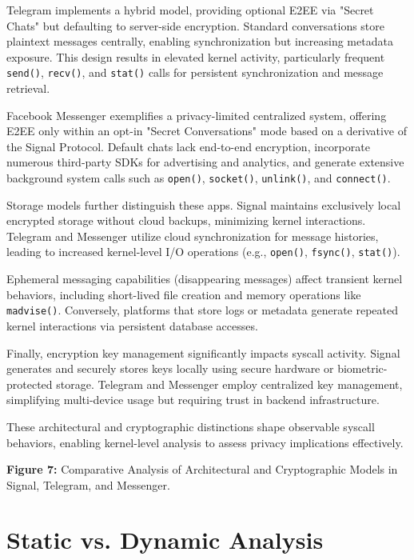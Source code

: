 \documentclass[a4paper,12pt]{report}
\begin{document}
Telegram implements a hybrid model, providing optional E2EE via "Secret Chats" but defaulting to server-side encryption. Standard conversations store plaintext messages centrally, enabling synchronization but increasing metadata exposure. This design results in elevated kernel activity, particularly frequent \texttt{send()}, \texttt{recv()}, and \texttt{stat()} calls for persistent synchronization and message retrieval.

Facebook Messenger exemplifies a privacy-limited centralized system, offering E2EE only within an opt-in "Secret Conversations" mode based on a derivative of the Signal Protocol. Default chats lack end-to-end encryption, incorporate numerous third-party SDKs for advertising and analytics, and generate extensive background system calls such as \texttt{open()}, \texttt{socket()}, \texttt{unlink()}, and \texttt{connect()}.

Storage models further distinguish these apps. Signal maintains exclusively local encrypted storage without cloud backups, minimizing kernel interactions. Telegram and Messenger utilize cloud synchronization for message histories, leading to increased kernel-level I/O operations (e.g., \texttt{open()}, \texttt{fsync()}, \texttt{stat()}).

Ephemeral messaging capabilities (disappearing messages) affect transient kernel behaviors, including short-lived file creation and memory operations like \texttt{madvise()}. Conversely, platforms that store logs or metadata generate repeated kernel interactions via persistent database accesses.

Finally, encryption key management significantly impacts syscall activity. Signal generates and securely stores keys locally using secure hardware or biometric-protected storage. Telegram and Messenger employ centralized key management, simplifying multi-device usage but requiring trust in backend infrastructure.

These architectural and cryptographic distinctions shape observable syscall behaviors, enabling kernel-level analysis to assess privacy implications effectively.

\textbf{Figure 7:} Comparative Analysis of Architectural and Cryptographic Models in Signal, Telegram, and Messenger.


\section{Static vs. Dynamic Analysis}
\end{document}
